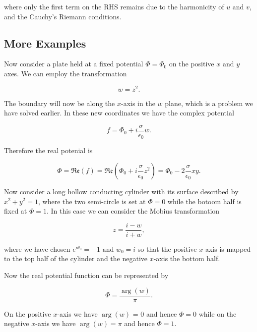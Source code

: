 \documentclass[english,a4paper,12pt]{report}
\begin{document}
where only the first term on the RHS remains due to the harmonicity of \(u \text { and } v\), and the Cauchy's Riemann conditions.

\subsection{More Examples}

Now consider a plate held at a fixed potential \(\Phi = \Phi _{0} \) on the positive \(x \text { and } y\) axes. We can employ the transformation 

\begin{equation}
    w = z^2.
\end{equation}

The boundary will now be along the \(x\)-axis in the \(w\) plane, which is a problem we have solved earlier. In these new coordinates we have the complex potential 

\begin{equation}
    f = \Phi _{0} + i \frac{\sigma }{\epsilon_0 }w.  
\end{equation}

Therefore the real potenial is 

\begin{equation}
    \Phi = \mathfrak{Re} (f) = \mathfrak{Re} \left( \Phi _{0} + i \frac{\sigma }{\epsilon_0 }z^2  \right) = \Phi _{0} - 2 \frac{\sigma }{\epsilon_0 }xy.  
\end{equation}

Now consider a long hollow conducting cylinder with its surface described by \(x^2+y^2=1\), where the two semi-circle is set at \(\Phi = 0\) while the botoom half is fixed at \(\Phi  = 1\). In this case we can consider the Mobius transformation 

\begin{equation}
    z = \frac{i-w}{i+w}, 
\end{equation}

where we have chosen \(e^{i \theta _{0} } = -1 \text { and } w_{0} = i\) so that the positive \(x\)-axis is mapped to the top half of the cylinder and the negative \(x\)-axis the bottom half. 

Now the real potential function can be represented by 

\begin{equation}
    \Phi  = \frac{\arg (w)}{\pi }. 
\end{equation}

On the positive \(x\)-axis we have \(\arg (w)\) = 0 and hence \(\Phi  = 0\) while on the negative \(x\)-axis we have \(\arg (w) = \pi \) and hence \(\Phi  = 1\).  
\end{document}
